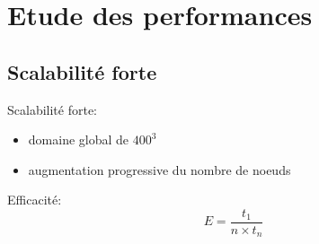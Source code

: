 \documentclass{beamer}
\begin{document}
%
%

\section{Etude des performances}
\subsection{Scalabilité forte}
\begin{frame}
  Scalabilité forte:
  \begin{itemize}
  \item domaine global de $400^3$
  \item augmentation progressive du nombre de noeuds
  \end{itemize}
  \vfill
  Efficacité: $$E=\frac{t_1}{n\times t_n}$$
\end{frame}


\begin{frame}
  \centering
    
\end{frame}
\end{document}
